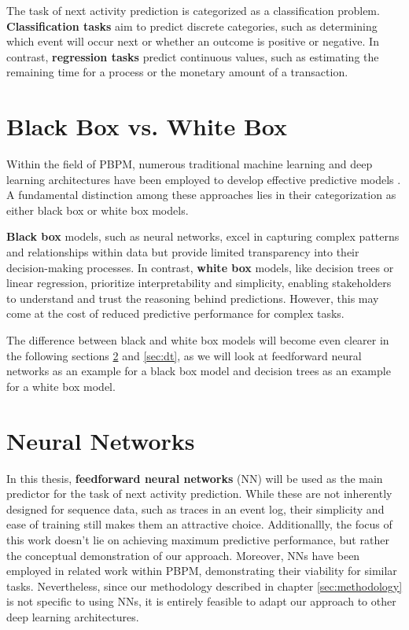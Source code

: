 The task of next activity prediction is categorized as a classification problem.
\textbf{Classification tasks} aim to predict discrete categories,
such as determining which event will occur next or whether an outcome is positive or negative.
In contrast, \textbf{regression tasks} predict continuous values,
such as estimating the remaining time for a process or the monetary amount of a transaction.

\section{Black Box vs. White Box}
Within the field of PBPM, numerous traditional machine learning
and deep learning architectures have been employed
to develop effective predictive models \cite{ml_pbpm}.
A fundamental distinction among these approaches
lies in their categorization as either black box or white box models.

\textbf{Black box} models, such as neural networks,
excel in capturing complex patterns and relationships within data
but provide limited transparency into their decision-making processes.
In contrast, \textbf{white box} models, like decision trees or linear regression,
prioritize interpretability and simplicity,
enabling stakeholders to understand and trust the reasoning behind predictions.
However, this may come at the cost of reduced predictive performance for complex tasks.
\cite{black_white}

The difference between black and white box models will become even clearer
in the following sections \ref{sec:nn} and \ref{sec:dt},
as we will look at feedforward neural networks as an example for a black box model
and decision trees as an example for a white box model.

\section{Neural Networks}
\label{sec:nn}
In this thesis, \textbf{feedforward neural networks} (NN)
will be used as the main predictor for the task of next activity prediction.
While these are not inherently designed for sequence data,
such as traces in an event log, their simplicity and ease of training still makes them an attractive choice.
Additionallly, the focus of this work doesn't lie on achieving maximum predictive performance,
but rather the conceptual demonstration of our approach.
Moreover, NNs have been employed in related work \cite{fairness_adversarial} within PBPM,
demonstrating their viability for similar tasks.
Nevertheless, since our methodology described in chapter \ref{sec:methodology}
is not specific to using NNs,
it is entirely feasible to adapt our approach to other deep learning architectures.

